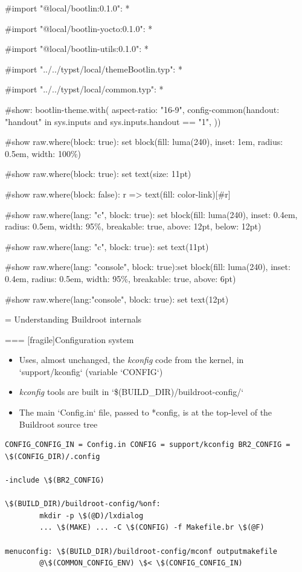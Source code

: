 #import "@local/bootlin:0.1.0": *

#import "@local/bootlin-yocto:0.1.0": *

#import "@local/bootlin-utils:0.1.0": *

#import "../../typst/local/themeBootlin.typ": *

#import "../../typst/local/common.typ": *

#show: bootlin-theme.with( aspect-ratio: "16-9", config-common(handout: "handout" in sys.inputs and sys.inputs.handout == "1", ))

#show raw.where(block: true): set block(fill: luma(240), inset: 1em, radius: 0.5em, width: 100\%)

#show raw.where(block: true): set text(size: 11pt)

#show raw.where(block: false): r => text(fill: color-link)[#r]

#show raw.where(lang: "c", block: true): set block(fill: luma(240), inset: 0.4em, radius: 0.5em, width: 95\%, breakable: true, above: 12pt, below: 12pt)

#show raw.where(lang: "c", block: true): set text(11pt)

#show raw.where(lang: "console", block: true):set block(fill: luma(240), inset: 0.4em, radius: 0.5em, width: 95\%, breakable: true, above: 6pt)

#show raw.where(lang:"console", block: true): set text(12pt)

 = Understanding Buildroot internals

=== [fragile]{Configuration system}
  \begin{itemize}
  \item Uses, almost unchanged, the {\em kconfig} code from the
    kernel, in `support/kconfig` (variable `CONFIG`)
  \item {\em kconfig} tools are built in
    `\$(BUILD_DIR)/buildroot-config/`
  \item The main `Config.in` file, passed to *config, is at the
    top-level of the Buildroot source tree
  \end{itemize}
\begin{block}{}
\begin{verbatim}
CONFIG_CONFIG_IN = Config.in CONFIG = support/kconfig BR2_CONFIG = \$(CONFIG_DIR)/.config

-include \$(BR2_CONFIG)

\$(BUILD_DIR)/buildroot-config/%onf:
        mkdir -p \$(@D)/lxdialog
        ... \$(MAKE) ... -C \$(CONFIG) -f Makefile.br \$(@F)

menuconfig: \$(BUILD_DIR)/buildroot-config/mconf outputmakefile
        @\$(COMMON_CONFIG_ENV) \$< \$(CONFIG_CONFIG_IN)
\end{verbatim}
\end{block}


